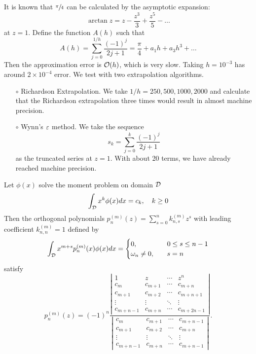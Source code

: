 \begin{example}
    It is known that $\sfrac{\pi}{4}$ can be calculated by the asymptotic expansion:
    \begin{equation}
        \arctan z = z - \frac{z^3}{3} + \frac{z^5}{5} - \dots 
    \end{equation}
    at $z = 1$. Define the function $A(h)$ such that 
    \begin{equation}
        A(h)= \sum_{j=0}^{1/h} \frac{(-1)^j}{2 j + 1} = \frac{\pi}{4} + a_1 h + a_3 h^3 + \dots
    \end{equation}
    Then the approximation error is $\mathcal O(h)$, which is very slow. Taking $h=10^{-3}$ has around $2\times 10^{-4}$ error.  We test with two extrapolation algorithms.
    \begin{enumerate}
        \item [$\circ$] Richardson Extrapolation. We take $1/h = 250, 500, 1000, 2000$ and calculate that the Richardson extrapolation three times would result in almost machine precision.
        \item [$\circ$] Wynn's $\varepsilon$ method. We take the sequence 
        $$s_k = \sum_{j=0}^k \frac{(-1)^j}{2 j + 1}$$
        as the truncated series at $z = 1$. With about 20 terms, we have already reached machine precision.
    \end{enumerate}
\end{example}
\begin{lemma}
    Let $\phi(x)$ solve the moment problem on domain $\mathcal D$
        $$\int_{\mathcal D} x^k \phi(x) dx = c_k,\quad k\ge 0 $$
    Then the orthogonal polynomials
     $p_{n}^{(m)}(z) = \sum_{s = 0}^{n} k_{n, s}^{(m)} z^s$ with leading coefficient $k_{n,n}^{(m)} = 1$ defined by 
    \begin{equation}
        \int_{\mathcal D} x^{m+s} p_n^{(m)}(x) \phi(x) dx = \begin{cases}
            0,\quad &0\le s\le n-1 \\
            \omega_n\neq 0,\quad &s = n
        \end{cases}
    \end{equation}
    satisfy
    \begin{equation}
        p_n^{(m)}(z) = (-1)^n \frac{\left|\begin{matrix}
            1 & z & \cdots & z^n \\
            c_m & c_{m+1} & \cdots & c_{m+n}\\
            c_{m+1} & c_{m+2} & \cdots & c_{m+n+1}\\
            \vdots & \vdots & \ddots & \vdots \\
            c_{m+n-1} & c_{m+n} & \cdots & c_{m+2n-1} 
        \end{matrix}\right|}{\left| \begin{matrix}
            c_m & c_{m+1} & \cdots & c_{m+n-1} \\
            c_{m+1} & c_{m+2} & \cdots & c_{m+n} \\ 
            \vdots & \vdots & \ddots & \vdots \\
            c_{m+n-1} & c_{m+n} & \cdots & c_{m+n-1}
        \end{matrix}\right|} .
    \end{equation}
\end{lemma}
